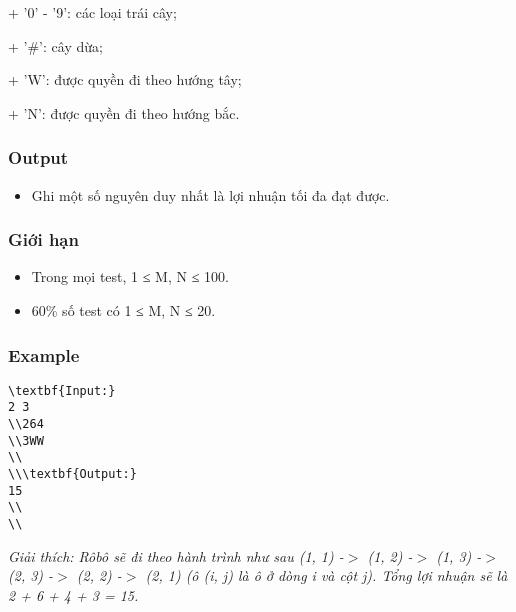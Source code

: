    + '0' - '9': các loại trái cây;  

   + '\#': cây dừa;  

   + 'W': được quyền đi theo hướng tây;  

   + 'N': được quyền đi theo hướng bắc.  

\subsubsection{   Output  }
\begin{itemize}
	\item     Ghi một số nguyên duy nhất là lợi nhuận tối đa đạt được.   
\end{itemize}

\subsubsection{   Giới hạn  }
\begin{itemize}
	\item     Trong mọi test, 1 ≤ M, N ≤ 100.   
	\item     60\% số test có 1 ≤ M, N ≤ 20.   
\end{itemize}

\subsubsection{   Example  }
\begin{verbatim}
\textbf{Input:}
2 3
\\264
\\3WW
\\
\\\textbf{Output:}
15
\\
\\\end{verbatim}

\emph{    Giải thích: Rôbô sẽ đi theo hành trình như sau (1, 1) -$>$ (1, 2) -$>$ (1, 3) -$>$ (2, 3) -$>$ (2, 2) -$>$ (2, 1) (ô (i, j) là ô ở dòng i và cột j). Tổng lợi nhuận sẽ là 2 + 6 + 4 + 3 = 15.   }